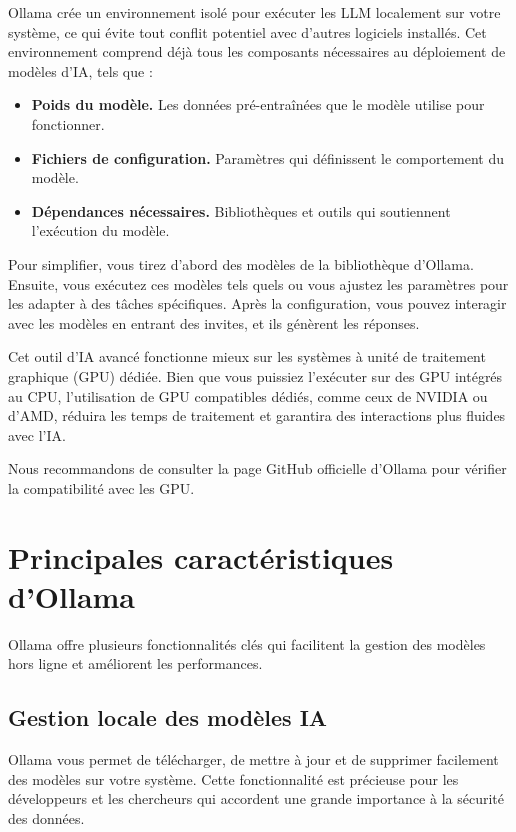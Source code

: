 Ollama crée un environnement isolé pour exécuter les LLM localement sur votre système, ce qui évite tout conflit potentiel avec d’autres logiciels installés. Cet environnement comprend déjà tous les composants nécessaires au déploiement de modèles d’IA, tels que :

\begin{itemize}
    \item \textbf{Poids du modèle.} Les données pré-entraînées que le modèle utilise pour fonctionner.
    \item \textbf{Fichiers de configuration.} Paramètres qui définissent le comportement du modèle.
    \item \textbf{Dépendances nécessaires.} Bibliothèques et outils qui soutiennent l’exécution du modèle.
\end{itemize}

\noindent
Pour simplifier, vous tirez d’abord des modèles de la bibliothèque d’Ollama. Ensuite, vous exécutez ces modèles tels quels ou vous ajustez les paramètres pour les adapter à des tâches spécifiques. Après la configuration, vous pouvez interagir avec les modèles en entrant des invites, et ils génèrent les réponses.

\medskip

\noindent
Cet outil d’IA avancé fonctionne mieux sur les systèmes à unité de traitement graphique (GPU) dédiée. Bien que vous puissiez l’exécuter sur des GPU intégrés au CPU, l’utilisation de GPU compatibles dédiés, comme ceux de NVIDIA ou d’AMD, réduira les temps de traitement et garantira des interactions plus fluides avec l’IA.

\medskip

\noindent
Nous recommandons de consulter la page GitHub officielle d’Ollama pour vérifier la compatibilité avec les GPU.

\section*{Principales caractéristiques d’Ollama}

Ollama offre plusieurs fonctionnalités clés qui facilitent la gestion des modèles hors ligne et améliorent les performances.

\subsection*{Gestion locale des modèles IA}

Ollama vous permet de télécharger, de mettre à jour et de supprimer facilement des modèles sur votre système. Cette fonctionnalité est précieuse pour les développeurs et les chercheurs qui accordent une grande importance à la sécurité des données.

